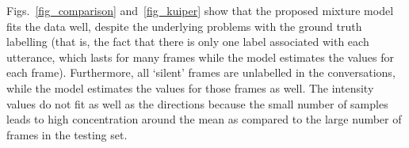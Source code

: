 \documentclass[10pt,journal,cspaper,compsoc]{IEEEtran}
\begin{document}
Figs.~\ref{fig_comparison} and~\ref{fig_kuiper} show that the proposed mixture model fits the data well, despite the underlying problems with the ground truth labelling (that is, the fact that there is only one label associated with each utterance, which lasts for many frames while the model estimates the values for each frame). Furthermore, all `silent' frames are unlabelled in the conversations, while the model estimates the values for those frames as well.  The intensity values do not fit as well as the directions because the small number of samples leads to high concentration around the mean as compared to the large number of frames in the testing set.

\begin{figure}[!htp]
\begin{center}
\\
\end{center}
\end{figure}
\end{document}
